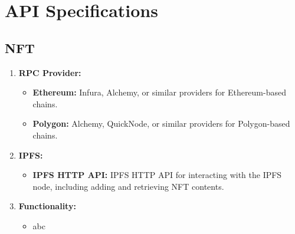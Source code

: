 \newpage

\chapter{API Specifications}
\section{NFT}
\begin{enumerate}
    \item \textbf{RPC Provider:}
    \begin{itemize}
        \item \textbf{Ethereum:} Infura, Alchemy, or similar providers for Ethereum-based chains.
        \item \textbf{Polygon:} Alchemy, QuickNode, or similar providers for Polygon-based chains.
    \end{itemize}

    \item \textbf{IPFS:}
    \begin{itemize}
        \item \textbf{IPFS HTTP API:} IPFS HTTP API for interacting with the IPFS node, including adding and retrieving NFT contents.
    \end{itemize}

    \item \textbf{Functionality:}
    \begin{itemize}
        \item abc
    \end{itemize}
\end{enumerate}

\newpage